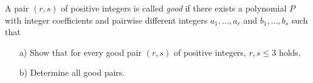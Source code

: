 A pair $(r,s)$ of positive integers is called \emph{good} if there exists a polynomial $P$ with
integer coefficients and pairwise different integers $a_1,\ldots,a_r$ and $b_1,\ldots,b_s$ such that
\begin{enumerate}
    \item[a)] Show that for every good pair $(r,s)$ of positive integers, $r,s \leq 3$ holds.
    \item[b)] Determine all good pairs.
\end{enumerate}
